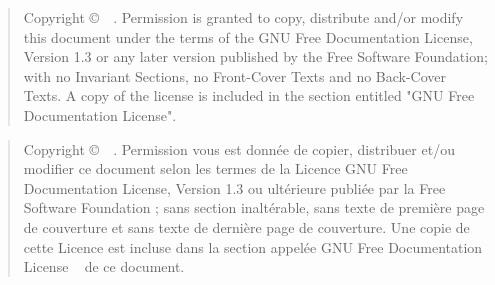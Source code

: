 \vspace*{\fill}
\begin{quote}\en
	Copyright \copyright\ \the\year\ \MAILGREGORY.
	Permission is granted to copy, distribute and/or modify this
	document under the terms of the GNU Free Documentation License,
	Version 1.3 or any later version published by the Free Software
	Foundation; with no Invariant Sections, no Front-Cover Texts and
	no Back-Cover Texts.  A copy of the license is included in the
	section entitled "GNU Free Documentation License".
\end{quote}
\vspace{2cm}
\begin{quote}\fr
	Copyright \copyright\ \the\year\ \MAILGREGORY.
	Permission vous est donn\'ee de copier, distribuer et/ou modifier ce document selon les termes de la
	Licence GNU Free Documentation License, Version 1.3 ou ult\'erieure publi\'ee par la Free Software
	Foundation ; sans section inalt\'erable, sans texte de premi\`ere page de couverture et sans texte
	de derni\`ere page de couverture. Une copie de cette Licence est incluse dans la section appel\'ee
	\og GNU Free Documentation License \fg~ de ce document.
\end{quote}
\vspace*{\fill}
